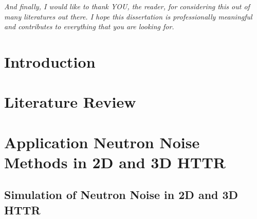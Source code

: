 \documentclass{uiucthesis2021}
\begin{document}
\begin{acknowledgments}
\textit{And finally, I would like to thank YOU, the reader, for considering this out of many literatures out there. I hope this dissertation is professionally meaningful and contributes to everything that you are looking for.}

\end{acknowledgments}

{
    \hypersetup{linkcolor=black}  %
    \tableofcontents
}

%
%
%

\mainmatter

\chapter{Introduction}


\chapter{Literature Review}



\chapter{Application Neutron Noise Methods in 2D and 3D HTTR}

\section{Simulation of Neutron Noise in 2D and 3D HTTR}
\end{document}
